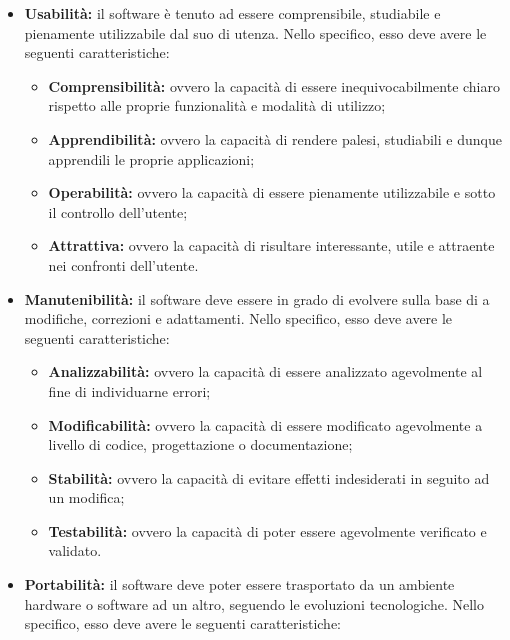 \documentclass[openany,12pt,a4paper]{report}
\begin{document}
\begin{itemize}
    \item \textbf{Usabilità:}  il software è tenuto ad essere comprensibile, studiabile e pienamente utilizzabile dal suo  di utenza. Nello specifico, esso deve avere le seguenti caratteristiche:
    
    \begin{itemize}
        \item \textbf{Comprensibilità:} ovvero la capacità di essere inequivocabilmente chiaro rispetto alle proprie funzionalità e modalità di utilizzo;
        \item \textbf{Apprendibilità:} ovvero la capacità di rendere palesi, studiabili e dunque apprendili le proprie applicazioni;
        \item \textbf{Operabilità:} ovvero la capacità di essere pienamente utilizzabile e sotto il controllo dell'utente;
        \item \textbf{Attrattiva:} ovvero la capacità di risultare interessante, utile e attraente nei confronti dell'utente.
    \end{itemize}
    
    \item \textbf{Manutenibilità:} il software deve essere in grado di evolvere sulla base di a modifiche, correzioni e adattamenti. Nello specifico, esso deve avere le seguenti caratteristiche:
    
    \begin{itemize}
        \item \textbf{Analizzabilità:} ovvero la capacità di essere analizzato agevolmente al fine di individuarne errori;
        \item \textbf{Modificabilità:} ovvero la capacità di essere modificato agevolmente a livello di codice, progettazione o documentazione;
        \item \textbf{Stabilità:} ovvero la capacità di evitare effetti indesiderati in seguito ad un modifica;
        \item \textbf{Testabilità:} ovvero la capacità di poter essere agevolmente verificato e validato.
    \end{itemize}
    
    \item \textbf{Portabilità:} il software deve poter essere trasportato da un ambiente hardware o software ad un altro, seguendo le evoluzioni tecnologiche. Nello specifico, esso deve avere le seguenti caratteristiche:
    

\end{itemize}
\end{document}
